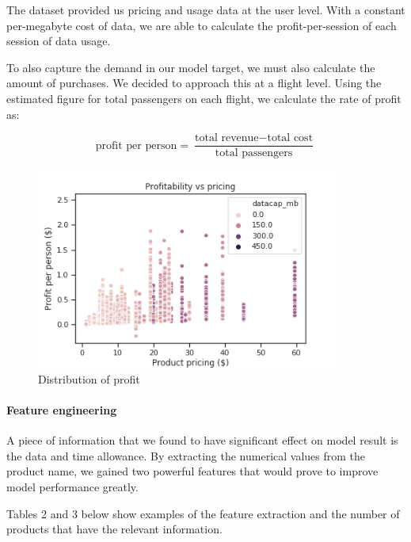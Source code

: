 \documentclass[]{article}
\let\oldparagraph\paragraph
\renewcommand{\paragraph}[1]{\oldparagraph{#1}\mbox{}}
\begin{document}
The dataset provided us pricing and usage data at the user level. With a
constant per-megabyte cost of data, we are able to calculate the
profit-per-session of each session of data usage.

To also capture the demand in our model target, we must also calculate
the amount of purchases. We decided to approach this at a flight level.
Using the estimated figure for total passengers on each flight, we
calculate the rate of profit as:

\[
\text{profit per person} = \frac{\text{total revenue} - \text{total cost} }{\text{total passengers}}
\]

\begin{figure}
\centering
\includegraphics[width=\textwidth,height=2.60417in]{figures/profit_scatter.png}
\caption{Distribution of profit}
\end{figure}

\hypertarget{feature-engineering}{%
\paragraph{Feature engineering}\label{feature-engineering}}

A piece of information that we found to have significant effect on model
result is the data and time allowance. By extracting the numerical
values from the product name, we gained two powerful features that would
prove to improve model performance greatly.

Tables 2 and 3 below show examples of the feature extraction and the
number of products that have the relevant information.
\end{document}
